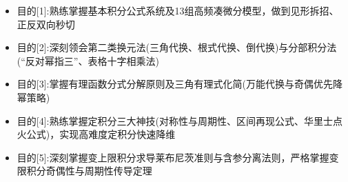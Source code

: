 \documentclass[11pt,a4paper,UTF8]{ctexart}
\begin{document}
\pagestyle{fancy}
\fancyhf{}
\fancyhead[R]{\small\color{TitlePurple}\nouppercase{\leftmark}}
\renewcommand{\headrulewidth}{0.5pt}

\tableofcontents
\newpage
{}


\begin{targetbox}[本章复习目标与核心知识图谱]
\begin{itemize}
  \item 目的[1]:熟练掌握基本积分公式系统及13组高频凑微分模型，做到见形拆招、正反双向秒切
\end{itemize}
\end{targetbox}

\begin{targetbox}[本章复习目标与核心知识图谱]
\begin{itemize}
  \item 目的[2]:深刻领会第二类换元法(三角代换、根式代换、倒代换)与分部积分法(“反对幂指三”、表格十字相乘法)
\end{itemize}
\end{targetbox}

\begin{targetbox}[本章复习目标与核心知识图谱]
\begin{itemize}
  \item 目的[3]:掌握有理函数分式分解原则及三角有理式化简(万能代换与奇偶优先降幂策略)
\end{itemize}
\end{targetbox}

\begin{targetbox}[本章复习目标与核心知识图谱]
\begin{itemize}
  \item 目的[4]:熟练掌握定积分三大神技(对称性与周期性、区间再现公式、华里士点火公式)，实现高难度定积分快速降维
\end{itemize}
\end{targetbox}

\begin{targetbox}[本章复习目标与核心知识图谱]
\begin{itemize}
  \item 目的[5]:深刻掌握变上限积分求导莱布尼茨准则与含参分离法则，严格掌握变限积分奇偶性与周期性传导定理
\end{itemize}
\end{targetbox}
\end{document}
